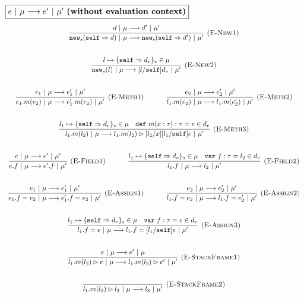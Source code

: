 \documentclass{llncs}
\newcommand{\keywadj}[1]{\mathtt{#1}}
\newcommand{\keyw}[1]{\keywadj{#1}~}
\begin{document}
\newpage

$\fbox{$e~|~\mu \longrightarrow e'~|~\mu'$ \textbf{(without evaluation context)}}$
\[
\begin{array}{c}
\infer[\textsc{(E-New1)}]
  {\keywadj{new}_{s}(\keywadj{self} \Rightarrow d)~|~\mu \longrightarrow \keywadj{new}_{s}(\keywadj{self} \Rightarrow d')~|~\mu'}
  {d~|~\mu \longrightarrow d'~|~\mu'}\\[5ex]

\infer[\textsc{(E-New2)}]
  {\keywadj{new}_{s}(l)~|~\mu \longrightarrow [l/\keywadj{self}]d_v~|~\mu'}
  {l \mapsto \{ \keywadj{self} \Rightarrow d_v \}_{s} \in \mu}\\[5ex]

\infer[\textsc{(E-Meth1)}]
  {e_1.m(e_2)~|~\mu \longrightarrow e_1'.m(e_2)~|~\mu'}
  {e_1~|~\mu \longrightarrow e_1'~|~\mu'}%
~~~~~~~~~~
\infer[\textsc{(E-Meth2)}]
  {l_1.m(e_2)~|~\mu \longrightarrow l_1.m(e_2')~|~\mu'}
  {e_2~|~\mu \longrightarrow e_2'~|~\mu'}\\[5ex]
  
\infer[\textsc{(E-Meth3)}]
  {l_1.m(l_2)~|~\mu \longrightarrow l_1.m(l_2) \rhd [l_2/x][l_1/\keywadj{self}]e~|~\mu'}
  {l_1 \mapsto \{ \keywadj{self} \Rightarrow d_v \}_{s} \in \mu & \keyw{def} m(x : \tau) : \tau = e \in d_v}\\[5ex]

\infer[\textsc{(E-Field1)}]
  {e.f~|~\mu \longrightarrow e'.f~|~\mu'}
  {e~|~\mu \longrightarrow e'~|~\mu'}%
~~~~~~~~~~
\infer[\textsc{(E-Field2)}]
  {l_1.f~|~\mu \longrightarrow l_2~|~\mu'}
  {l_1 \mapsto \{ \keywadj{self} \Rightarrow d_v \}_{s} \in \mu & \keyw{var} f:\tau = l_2 \in d_v}\\[5ex]

\infer[\textsc{(E-Assign1)}]
  {e_1.f = e_2~|~\mu \longrightarrow e_1'.f = e_2~|~\mu'}
  {e_1~|~\mu \longrightarrow e_1'~|~\mu'}%
~~~~~~~~~~
\infer[\textsc{(E-Assign2)}]
  {l_1.f = e_2~|~\mu \longrightarrow l_1.f = e_2'~|~\mu'}
  {e_2~|~\mu \longrightarrow e_2'~|~\mu'}\\[5ex]

\infer[\textsc{(E-Assign3)}]
  {l_1.f = e~|~\mu \longrightarrow l_1.f = [l_1/\keywadj{self}]e~|~\mu'}
  {l_1 \mapsto \{ \keywadj{self} \Rightarrow d_v \}_{s} \in \mu & \keyw{var} f:\tau = e \in d_v}\\[5ex]

\infer[\textsc{(E-StackFrame1)}]
  {l_1.m(l_2) \rhd e~|~\mu \longrightarrow l_1.m(l_2) \rhd e'~|~\mu'}
  {e~|~\mu \longrightarrow e'~|~\mu}\\[5ex]

\infer[\textsc{(E-StackFrame2)}]
  {l_1.m(l_2) \rhd l_3~|~\mu \longrightarrow l_3~|~\mu'}
  {}\\[5ex]
  
\end{array}
\]
\end{document}
